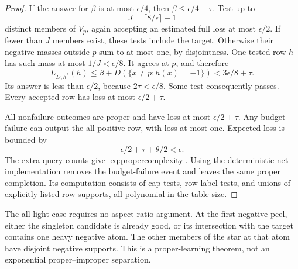 \begin{proof}
If the answer for $\beta$ is at most $\epsilon/4$, then $\beta\le\epsilon/4+\tau$. Test up to
\[
 J=\lceil8/\epsilon\rceil+1
\]
distinct members of $V_p$, again accepting an estimated full loss at most $\epsilon/2$. If fewer than $J$ members exist, these tests include the target. Otherwise their negative masses outside $p$ sum to at most one, by disjointness. One tested row $h$ has such mass at most $1/J<\epsilon/8$. It agrees at $p$, and therefore
\[
 L_{D,h^*}(h)\le\beta+D(\{x\ne p:h(x)=-1\})
 <3\epsilon/8+\tau.
\]
Its answer is less than $\epsilon/2$, because $2\tau<\epsilon/8$. Some test consequently passes. Every accepted row has loss at most $\epsilon/2+\tau$.

All nonfailure outcomes are proper and have loss at most $\epsilon/2+\tau$. Any budget failure can output the all-positive row, with loss at most one. Expected loss is bounded by
\[
 \epsilon/2+\tau+\theta/2<\epsilon.
\]
The extra query counts give \eqref{eq:propercomplexity}. Using the deterministic net implementation removes the budget-failure event and leaves the same proper completion. Its computation consists of cap tests, row-label tests, and unions of explicitly listed row supports, all polynomial in the table size.
\end{proof}

The all-light case requires no aspect-ratio argument. At the first negative peel, either the singleton candidate is already good, or its intersection with the target contains one heavy negative atom. The other members of the star at that atom have disjoint negative supports. This is a proper-learning theorem, not an exponential proper--improper separation.
